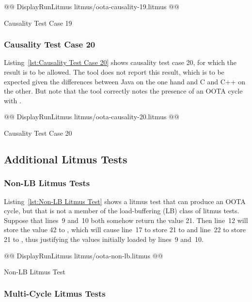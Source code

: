 \documentclass[10]{article}
\begin{document}
\begin{listing}[tbp]
@@ DisplayRunLitmus litmus/oota-causality-19.litmus @@
\caption{Causality Test Case 19}
\label{lst:Causality Test Case 19}
\end{listing}

\subsubsection{Causality Test Case 20}
\label{app:Causality Test Case 20}

Listing~\ref{lst:Causality Test Case 20}
shows causality test case 20, for which the 
result is to be allowed.
The  tool does not report this result, which is to be expected
given the differences between Java on the one hand and C and C++
on the other.
But note that the  tool correctly notes the presence of an
OOTA cycle with .

\begin{listing}[tbp]
@@ DisplayRunLitmus litmus/oota-causality-20.litmus @@
\caption{Causality Test Case 20}
\label{lst:Causality Test Case 20}
\end{listing}

\subsection{Additional Litmus Tests}
\label{app:Additional Litmus Tests}

\subsubsection{Non-LB Litmus Tests}
\label{app:Non-LB Litmus Tests}

Listing~\ref{lst:Non-LB Litmus Test}
shows a litmus test that can produce an OOTA cycle, but that is not
a member of the load-buffering (LB) class of litmus tests.
Suppose that lines~9 and~10 both somehow return the value 21.
Then line~12 will store the value 42 to , which will cause
line~17 to store 21 to  and line~22 to store 21 to ,
thus justifying the values initially loaded by lines~9 and~10.

\begin{listing}[tbp]
@@ DisplayRunLitmus litmus/oota-non-lb.litmus @@
\caption{Non-LB Litmus Test}
\label{lst:Non-LB Litmus Test}
\end{listing}

\subsubsection{Multi-Cycle Litmus Tests}
\label{app:Multi-Cycle Litmus Tests}
\end{document}
